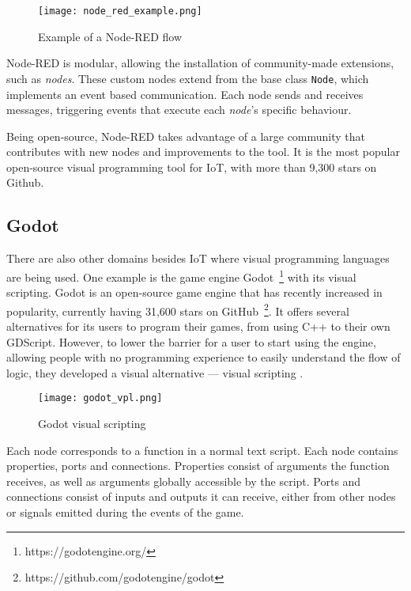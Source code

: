 \begin{figure}[!ht]
\centering
\texttt{[image: node\_red\_example.png]}
\caption{Example of a Node-RED flow}
\label{fig:node_red_example}
\end{figure}

Node-RED is modular, allowing the installation of community-made extensions, such as \textit{nodes}. These custom nodes extend from the base class \texttt{Node}, which implements an event based communication. Each node sends and receives messages, triggering events that execute each \textit{node}'s specific behaviour.

Being open-source, Node-RED takes advantage of a large community that contributes with new nodes and improvements to the tool. It is the most popular open-source visual programming tool for IoT, with more than 9,300 stars on Github.

\subsection{Godot}\label{sec:godot}

There are also other domains besides IoT where visual programming languages are being used. One example is the game engine Godot~\footnote{https://godotengine.org/} with its visual scripting. Godot is an open-source game engine that has recently increased in popularity, currently having 31,600 stars on GitHub~\footnote{https://github.com/godotengine/godot}. It offers several alternatives for its users to program their games, from using C++ to their own GDScript. However, to lower the barrier for a user to start using the engine, allowing people with no programming experience to easily understand the flow of logic, they developed a visual alternative --- visual scripting .

\begin{figure}[!ht]
\centering
\texttt{[image: godot\_vpl.png]}
\caption[Godot visual scripting]{Godot visual scripting~\cite{godot_image}}
\label{fig:godot}
\end{figure}

Each node corresponds to a function in a normal text script. Each node contains properties, ports and connections. Properties consist of arguments the function receives, as well as arguments globally accessible by the script. Ports and connections consist of inputs and outputs it can receive, either from other nodes or signals emitted during the events of the game.


